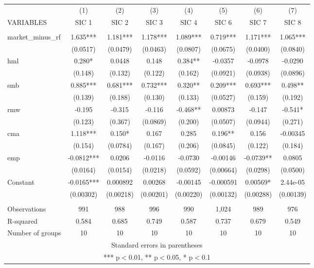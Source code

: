 \begin{tabular}{lccccccc} \hline
 & (1) & (2) & (3) & (4) & (5) & (6) & (7) \\
VARIABLES & SIC 1 & SIC 2 & SIC 3 & SIC 4 & SIC 6 & SIC 7 & SIC 8 \\ \hline
 &  &  &  &  &  &  &  \\
market\_minus\_rf & 1.635*** & 1.181*** & 1.178*** & 1.089*** & 0.719*** & 1.171*** & 1.065*** \\
 & (0.0517) & (0.0479) & (0.0463) & (0.0807) & (0.0675) & (0.0400) & (0.0840) \\
hml & 0.280* & 0.0448 & 0.148 & 0.384** & -0.0357 & -0.0978 & -0.0290 \\
 & (0.148) & (0.132) & (0.122) & (0.162) & (0.0921) & (0.0938) & (0.0896) \\
smb & 0.885*** & 0.681*** & 0.732*** & 0.320** & 0.209*** & 0.693*** & 0.498** \\
 & (0.139) & (0.188) & (0.130) & (0.133) & (0.0527) & (0.159) & (0.192) \\
rmw & -0.195 & -0.315 & -0.116 & -0.468** & 0.00873 & -0.147 & -0.541* \\
 & (0.123) & (0.367) & (0.0869) & (0.200) & (0.0507) & (0.0944) & (0.271) \\
cma & 1.118*** & 0.150* & 0.167 & 0.285 & 0.196** & 0.156 & -0.00345 \\
 & (0.154) & (0.0784) & (0.167) & (0.206) & (0.0845) & (0.122) & (0.184) \\
emp & -0.0812*** & 0.0206 & -0.0116 & -0.0730 & -0.00146 & -0.0739** & 0.0805 \\
 & (0.0164) & (0.0154) & (0.0218) & (0.0592) & (0.00664) & (0.0298) & (0.0500) \\
Constant & -0.0165*** & 0.000892 & 0.00268 & -0.00145 & -0.000591 & 0.00569* & 2.44e-05 \\
 & (0.00302) & (0.00218) & (0.00201) & (0.00220) & (0.00132) & (0.00288) & (0.00139) \\
 &  &  &  &  &  &  &  \\
Observations & 991 & 988 & 996 & 990 & 1,024 & 989 & 976 \\
R-squared & 0.584 & 0.685 & 0.749 & 0.587 & 0.737 & 0.679 & 0.549 \\
 Number of groups & 10 & 10 & 10 & 10 & 10 & 10 & 10 \\ \hline
\multicolumn{8}{c}{ Standard errors in parentheses} \\
\multicolumn{8}{c}{ *** p$<$0.01, ** p$<$0.05, * p$<$0.1} \\
\end{tabular}
